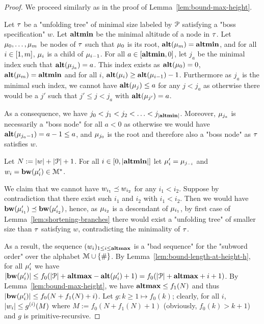 \begin{proof}
	We proceed similarly as in the proof of Lemma~\ref{lem:bound-max-height}.
	
	Let $\tau$ be a "unfolding tree" of minimal size labeled by $\mathcal{P}$ satisfying a "boss specification" $w$. Let $\mathbf{altmin}$ be the minimal altitude of a node in $\tau$. Let $\mu_0, \ldots, \mu_m$ be nodes of $\tau$ such that $\mu_0$ is its root, $\mathbf{alt}(\mu_m) = \mathbf{altmin}$, and for all $i\in [1,m]$, $\mu_i$ is a child of $\mu_{i-1}$.
	For all $a \in [\mathbf{altmin},0]$, let $j_a$ be the minimal index such that $\mathbf{alt}(\mu_{j_a}) = a$. This index exists as $\mathbf{alt}(\mu_0) = 0$, $\mathbf{alt}(\mu_m) = \mathbf{altmin}$ and for all $i$, $\mathbf{alt}(\mu_{i}) \geq \mathbf{alt}(\mu_{i-1})-1$.
	Furthermore as $j_a$ is the minimal such index, we cannot have $\mathbf{alt}(\mu_j) \leq a$ for any $j < j_a$ as otherwise there would be a $j'$ such that $j' \leq j < j_a$ with $\mathbf{alt}(\mu_{j'}) = a$.
	
	As a consequence, we have $j_0 < j_1 < j_2 < \ldots < j_{|\mathbf{altmin}|}$. Moreover, $\mu_{j_a}$ is necessarily a "boss node" for all $a<0$ as otherwise we would have $\mathbf{alt}(\mu_{j_a-1}) = a-1 \leq a$, and $\mu_{j_0}$ is the root and therefore also a "boss node" as $\tau$ satisfies $w$.
	
	Let $N := |w| + |\mathcal{P}|+1$. For all $i \in [0,|\mathbf{altmin}|]$ let $\mu'_i = \mu_{j_{-i}}$ and $w_i = \mathbf{bw}(\mu'_{i}) \in \mathcal{M}^*$.
	
	We claim that we cannot have $w_{i_1}\preceq w_{i_2}$ for any  $i_1< i_2$.
	Suppose by contradiction that there exist such $i_1$ and $i_2$ with $i_1 < i_2$. Then we would have $\mathbf{bw}(\mu'_{i_1}) \preceq \mathbf{bw}(\mu'_{i_2})$, hence, as $\mu_{i_2}$ is a descendant of $\mu_{i_1}$, by first case of Lemma~\ref{lem:shortening-branches} there would exist a "unfolding tree" of smaller size than $\tau$ satisfying $w$, contradicting the minimality of $\tau$.
	
	As a result, the sequence $(w_i)_{1\leq i \leq \mathbf{altmax}}$ is a "bad sequence" for the "subword order" over the alphabet $\mathcal{M}\cup\{\#\}$.
	By Lemma~\ref{lem:bound-length-at-height-h}, for all $\mu'_i$ we have $|\mathbf{bw}(\mu'_i)| \leq f_0(|\mathcal{P}| + \mathbf{altmax} - \mathbf{alt}(\mu'_i)+1) = f_0(|\mathcal{P}| + \mathbf{altmax} +i+1)$.
	By Lemma~\ref{lem:bound-max-height}, we have $\mathbf{altmax} \leq f_1(N)$ and thus $|\mathbf{bw}(\mu'_i)| \leq  f_0(N+f_1(N)+i)$. Let $g: k \geq 1 \mapsto f_0(k)$; clearly, for all $i$, $|w_i| \leq g^{(i)}(M)$ where $M := f_0(N + f_1(N)+1)$ (obviously, $f_0(k) > k+1$) and $g$ is primitive-recursive.
	

\end{proof}
